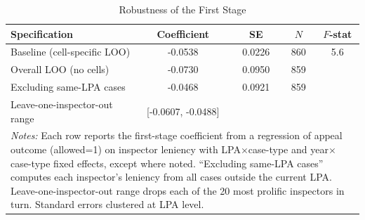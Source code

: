 \begin{table}[t]
\centering
\caption{Robustness of the First Stage}
\label{tab:robustness}
\begin{tabular}{lcccc}
\hline\hline
Specification & Coefficient & SE & $N$ & $F$-stat \\
\hline
Baseline (cell-specific LOO) & -0.0538 & 0.0226 & 860 & 5.6 \\
Overall LOO (no cells) & -0.0730 & 0.0950 & 859 & \\
Excluding same-LPA cases & -0.0468 & 0.0921 & 859 & \\
Leave-one-inspector-out range & [-0.0607, -0.0488] & & & \\
\hline
\multicolumn{5}{p{0.9\textwidth}}{\footnotesize \textit{Notes:} Each row reports the first-stage coefficient from a regression of appeal outcome (allowed=1) on inspector leniency with LPA$\times$case-type and year$\times$case-type fixed effects, except where noted. ``Excluding same-LPA cases'' computes each inspector's leniency from all cases outside the current LPA. Leave-one-inspector-out range drops each of the 20 most prolific inspectors in turn. Standard errors clustered at LPA level.} \\
\end{tabular}
\end{table}
